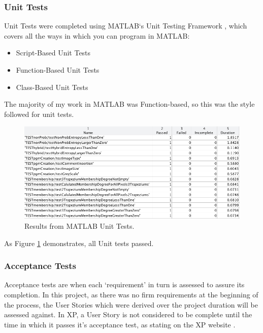 \subsubsection{Unit Tests}

Unit Tests were completed using MATLAB`s Unit Testing Framework \cite{testing}, which covers all the ways in which you can program in MATLAB:

\begin{itemize}
  \item Script-Based Unit Tests
  \item Function-Based Unit Tests
  \item Class-Based Unit Tests
  \end{itemize}

The majority of my work in MATLAB was Function-based, so this was the style followed for unit tests.

\begin{figure}[H]
  \centering
  \includegraphics[width=\textwidth]{Chapter2/software-img/test-results.png}
  \caption{Results from MATLAB Unit Tests.}
  \label{fig:unit-test-results}
\end{figure}

As Figure \ref{fig:unit-test-results} demonstrates, all Unit tests passed.

\subsubsection{Acceptance Tests}

Acceptance tests are when each `requirement' in turn is assessed to assure its completion. In this project, as there was no firm requirements at the beginning of the process, the User Stories which were derived over the project duration will be assessed against. In \acrfull{XP}, a User Story is not considered to be complete until the time in which it passes it's acceptance test, as stating on the \acrshort{XP} website \cite{Acceptance_Tests}.


